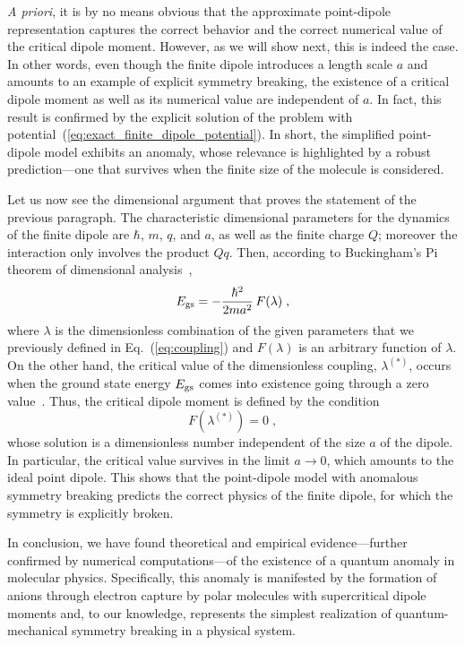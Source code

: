 \documentclass[a4paper,twocolumn,
showpacs,amssymb,aps,prl,superscriptaddress]{revtex4}%
\begin{document}
{\em A priori\/}, it is by no means obvious that the approximate
point-dipole representation captures the correct behavior and the
correct numerical value of the critical dipole moment. However,
as we will show next, this is indeed the case.
 In other words, even though the finite dipole introduces a length scale $a$
 and amounts to an example of explicit symmetry breaking, the
existence of a critical dipole moment as well as its numerical
value are independent of $a$. In fact, this result is confirmed
by the explicit solution of the problem with
potential~(\ref{eq:exact_finite_dipole_potential}).
 In short, the simplified point-dipole model exhibits an
anomaly, whose relevance is highlighted by a robust
prediction---one that survives when the finite size of the
molecule is considered.

Let us now see the dimensional argument
that proves the statement of the previous paragraph. The
characteristic dimensional parameters for the dynamics of the
finite dipole are $\hbar$, $m$, $q$, and $a$, as well as the
finite charge $Q$; moreover the interaction only involves the
product $Qq$.
 Then, according to Buckingham's Pi theorem of
dimensional analysis~\cite{pi_theorem},
\begin{equation}
E_{\rm gs} = - \frac{\hbar^{2}}{2m a^{2}} \, F (\lambda) \;  ,
\end{equation}
where $\lambda $ is the dimensionless combination of the given
parameters that we previously defined in Eq.~(\ref{eq:coupling})
and $F(\lambda)$ is an arbitrary function of $\lambda$. On the
other hand, the critical value of the dimensionless coupling,
$\lambda^{(*)}$, occurs when the ground state energy $E_{\rm gs}$
comes into existence going through a 
zero value~\cite{energy_subtlety}. 
Thus, the critical dipole moment is defined by
the condition
\begin{equation}
F(\lambda^{(*)}) =0 \;  ,
\end{equation}
whose solution is a dimensionless number independent of the size
$a$ of the dipole. In particular, the critical value survives in
the limit $a \rightarrow 0$, which amounts to the ideal point
dipole. This shows that the point-dipole model with anomalous
symmetry breaking predicts the correct physics of the finite
dipole, for which the symmetry is explicitly broken.

In conclusion, we have found theoretical and empirical
evidence---further confirmed by numerical computations---of the
existence of a quantum anomaly in molecular physics.
Specifically, this anomaly is manifested by the formation of
anions through electron capture by polar molecules with
supercritical dipole moments and, to our knowledge, represents
the simplest realization of quantum-mechanical symmetry breaking
in a physical system.
\end{document}
